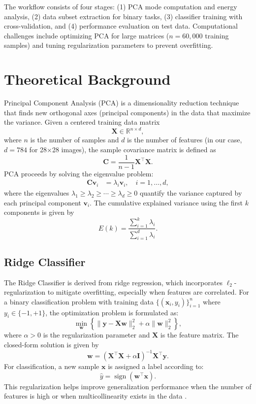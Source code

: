 \documentclass[11pt]{amsart}
\begin{document}
The workflow consists of four stages: (1) PCA mode computation and energy analysis, (2) data subset extraction for binary tasks, (3) classifier training with cross-validation, and (4) performance evaluation on test data. Computational challenges include optimizing PCA for large matrices (\( n = 60,000 \) training samples) and tuning regularization parameters to prevent overfitting.

\section{Theoretical Background}

Principal Component Analysis (PCA) is a dimensionality reduction technique that finds new orthogonal axes (principal components) in the data that maximize the variance. Given a centered training data matrix 
\[
\mathbf{X} \in \mathbb{R}^{n \times d},
\]
where \(n\) is the number of samples and \(d\) is the number of features (in our case, \(d=784\) for 28×28 images), the sample covariance matrix is defined as
\[
\mathbf{C} = \frac{1}{n-1}\mathbf{X}^\top \mathbf{X}.
\]
PCA \cite{Jolliffe2016} proceeds by solving the eigenvalue problem:
\begin{align*}
\mathbf{C}\mathbf{v}_i &= \lambda_i \mathbf{v}_i, \quad i = 1,\dots,d,
\end{align*}
where the eigenvalues \(\lambda_1 \geq \lambda_2 \geq \cdots \geq \lambda_d \geq 0\) quantify the variance captured by each principal component \(\mathbf{v}_i\). The cumulative explained variance using the first \(k\) components is given by
\[
E(k) = \frac{\sum_{i=1}^{k}\lambda_i}{\sum_{i=1}^{d}\lambda_i}.
\]

\subsection{Ridge Classifier}
The Ridge Classifier is derived from ridge regression, which incorporates \(\ell_2\)-regularization to mitigate overfitting, especially when features are correlated. For a binary classification problem with training data \(\{(\mathbf{x}_i, y_i)\}_{i=1}^n\) where \(y_i \in \{-1, +1\}\), the optimization problem is formulated as:
\[
\min_{\mathbf{w}} \left\{ \|\mathbf{y} - \mathbf{X}\mathbf{w}\|_2^2 + \alpha \|\mathbf{w}\|_2^2 \right\},
\]
where \(\alpha > 0\) is the regularization parameter and \(\mathbf{X}\) is the feature matrix. The closed-form solution is given by
\[
\mathbf{w} = \left(\mathbf{X}^\top \mathbf{X} + \alpha \mathbf{I}\right)^{-1}\mathbf{X}^\top \mathbf{y}.
\]
For classification, a new sample \(\mathbf{x}\) is assigned a label according to:
\[
\hat{y} = \operatorname{sign}(\mathbf{w}^\top \mathbf{x}).
\]
This regularization helps improve generalization performance when the number of features is high or when multicollinearity exists in the data \cite{Hoerl1970}.
\end{document}
